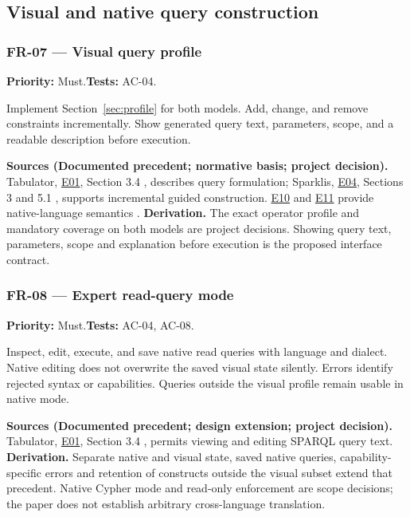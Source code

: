 \documentclass[11pt,a4paper]{article}
\newcommand{\req}[4]{\subsubsection*{#1 --- #2}\phantomsection\label{req:#1}\textbf{Priority:} #3.\quad\textbf{Tests:} #4.\par}
\newcommand{\origin}[3]{\par{\small\textbf{Sources (#1).} #2 \textbf{Derivation.} #3\par}}
\newcommand{\evidence}[1]{\hyperlink{evidence:#1}{#1}}
\begin{document}
\subsection{Visual and native query construction}
\par\noindent\begin{minipage}{\linewidth}
\req{FR-07}{Visual query profile}{Must}{AC-04}
Implement Section~\ref{sec:profile} for both models. Add, change, and remove constraints incrementally. Show generated query text, parameters, scope, and a readable description before execution.
\origin{Documented precedent; normative basis; project decision}{Tabulator, \evidence{E01}, Section 3.4 \citep{tabulator}, describes query formulation; Sparklis, \evidence{E04}, Sections 3 and 5.1 \citep{sparklis}, supports incremental guided construction. \evidence{E10} and \evidence{E11} provide native-language semantics \citep{sparql,opencypher}.}{The exact operator profile and mandatory coverage on both models are project decisions. Showing query text, parameters, scope and explanation before execution is the proposed interface contract.}
\end{minipage}\par
\par\noindent\begin{minipage}{\linewidth}
\req{FR-08}{Expert read-query mode}{Must}{AC-04, AC-08}
Inspect, edit, execute, and save native read queries with language and dialect. Native editing does not overwrite the saved visual state silently. Errors identify rejected syntax or capabilities. Queries outside the visual profile remain usable in native mode.
\origin{Documented precedent; design extension; project decision}{Tabulator, \evidence{E01}, Section 3.4 \citep{tabulator}, permits viewing and editing SPARQL query text.}{Separate native and visual state, saved native queries, capability-specific errors and retention of constructs outside the visual subset extend that precedent. Native Cypher mode and read-only enforcement are scope decisions; the paper does not establish arbitrary cross-language translation.}
\end{minipage}\par
\end{document}

